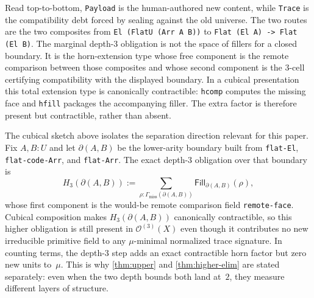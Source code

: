 \documentclass{lmcs}
\newcommand{\Ocal}{\mathcal{O}}
\begin{document}
Read top-to-bottom, \texttt{Payload} is the human-authored new content, while \texttt{Trace} is the compatibility debt forced by sealing against the old universe. The two routes are the two composites from \texttt{El (FlatU (Arr A B))} to \texttt{Flat (El A) -> Flat (El B)}. The marginal depth-$3$ obligation is not the space of fillers for a closed boundary. It is the horn-extension type whose free component is the remote comparison between those composites and whose second component is the $3$-cell certifying compatibility with the displayed boundary. In a cubical presentation this total extension type is canonically contractible: \texttt{hcomp} computes the missing face and \texttt{hfill} packages the accompanying filler. The extra factor is therefore present but contractible, rather than absent.

\begin{rem}
\label{rem:toy-separation}
The cubical sketch above isolates the separation direction relevant for this paper. Fix $A,B:U$ and let $\partial(A,B)$ be the lower-arity boundary built from \texttt{flat-El}, \texttt{flat-code-Arr}, and \texttt{flat-Arr}. The exact depth-$3$ obligation over that boundary is
\[
  H_3(\partial(A,B))
  :=
  \sum_{\rho : \Gamma_{\mathrm{miss}}(\partial(A,B))}
  \mathsf{Fill}_{\partial(A,B)}(\rho),
\]
whose first component is the would-be remote comparison field \texttt{remote-face}. Cubical composition makes $H_3(\partial(A,B))$ canonically contractible, so this higher obligation is still present in $\Ocal^{(3)}(X)$ even though it contributes no new irreducible primitive field to any $\mu$-minimal normalized trace signature. In counting terms, the depth-$3$ step adds an exact contractible horn factor but zero new units to~$\mu$. This is why \autoref{thm:upper} and \autoref{thm:higher-elim} are stated separately: even when the two depth bounds both land at~$2$, they measure different layers of structure.
\end{rem}
\end{document}
